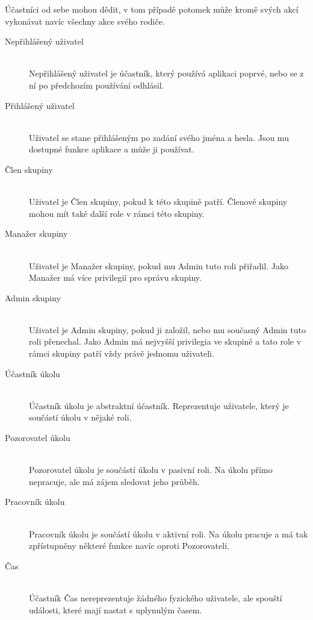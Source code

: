 \documentclass[thesis=B,czech]{FITthesis}[2012/06/26]
\begin{document}
			Účastníci od sebe mohou dědit, v tom případě potomek může kromě svých akcí vykonávat navíc všechny akce svého rodiče.
			\begin{description}
				\item[Nepřihlášený uživatel] \hfill \\ 
					Nepřihlášený uživatel je účastník, který používá aplikaci poprvé, nebo se z ní po předchozím používání odhlásil.
					
				\item[Přihlášený uživatel] \hfill \\ 
					Uživatel se stane přihlášeným po zadání svého jména a hesla. Jsou mu dostupné funkce aplikace a může ji používat.
				
				\item[Člen skupiny] \hfill \\ 
					Uživatel je Člen skupiny, pokud k této skupině patří. Členové skupiny mohou mít také další role v rámci této skupiny.
				
				\item[Manažer skupiny] \hfill \\ 
					Uživatel je Manažer skupiny, pokud mu Admin tuto roli přiřadil. Jako Manažer má více privilegií pro správu skupiny.
				
				\item[Admin skupiny] \hfill \\ 
					Uživatel je Admin skupiny, pokud ji založil, nebo mu současný Admin tuto roli přenechal. Jako Admin má nejvyšší privilegia ve skupině a tato role v rámci skupiny patří vždy právě jednomu uživateli.
					
				\item[Účastník úkolu] \hfill \\
					Účastník úkolu je abstraktní účastník. Reprezentuje uživatele, který je součástí úkolu v nějaké roli.
				
				\item[Pozorovatel úkolu] \hfill \\ 
					Pozorovatel úkolu je součástí úkolu v pasivní roli. Na úkolu přímo nepracuje, ale má zájem sledovat jeho průběh.
				
				\item[Pracovník úkolu] \hfill \\ 
					Pracovník úkolu je součástí úkolu v aktivní roli. Na úkolu pracuje a má tak zpřístupněny některé funkce navíc oproti Pozorovateli.
				
				\item[Čas] \hfill \\ 								
					Účastník Čas nereprezentuje žádného fyzického uživatele, ale spouští události, které mají nastat s uplynulým časem. \cite{uml-unified-process}
					

			\end{description}			
\end{document}
